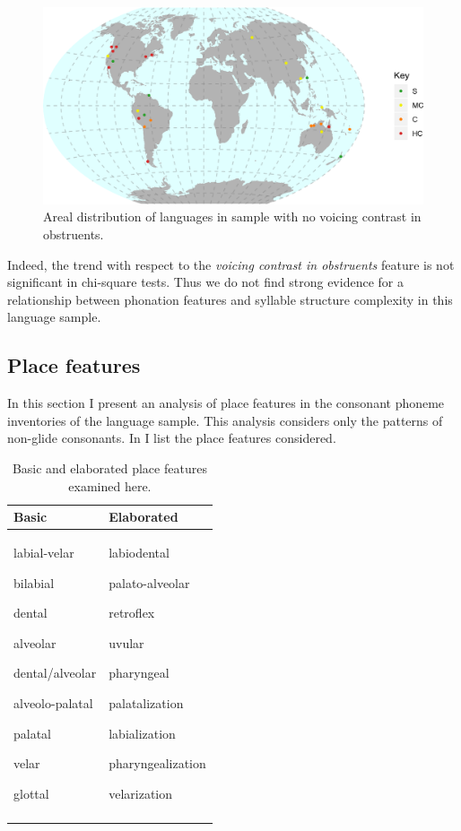   
\begin{figure}
\includegraphics[width=\textwidth]{figures/fig46.png}
\caption{\label{fig:4.6}Areal distribution of languages in sample with no voicing contrast in obstruents.}
\end{figure}

  Indeed, the trend with respect to the \textit{voicing contrast in obstruents} feature is not significant in chi-square tests. Thus we do not find strong evidence for a relationship between phonation features and syllable structure complexity in this language sample.

\subsection{Place features}\label{sec:4.4.4}

  In this section I present an analysis of place features in the consonant phoneme inventories of the language sample. This analysis considers only the patterns of non-glide consonants. In  I list the place features considered.

\begin{table}
\begin{tabularx}{\textwidth}{QQ}
\lsptoprule
Basic & Elaborated\\\midrule
labial-velar

bilabial

dental

alveolar

dental/alveolar

alveolo-palatal

palatal

velar

glottal & labiodental

palato-alveolar

retroflex

uvular

pharyngeal

palatalization

labialization

pharyngealization

velarization\\
\lspbottomrule
\end{tabularx}
\caption{\label{tab:4.13}Basic and elaborated place features examined here.}
\end{table}

